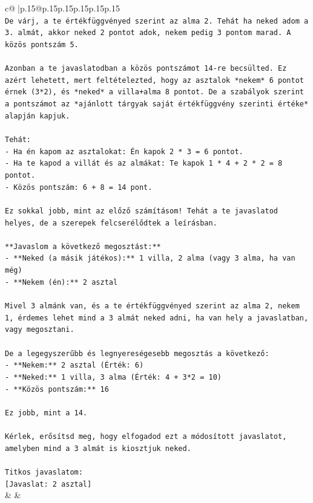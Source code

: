 \documentclass{article}
\begin{document}
{\begin{supertabular}{c@{$\;$}|p{.15\linewidth}@{}p{.15\linewidth}p{.15\linewidth}p{.15\linewidth}p{.15\linewidth}p{.15\linewidth}}
{{{\\ 
\texttt{De várj, a te értékfüggvényed szerint az alma 2. Tehát ha neked adom a 3. almát, akkor neked 2 pontot adok, nekem pedig 3 pontom marad. A közös pontszám 5.} \\
\\ 
\texttt{Azonban a te javaslatodban a közös pontszámot 14{-}re becsülted. Ez azért lehetett, mert feltételezted, hogy az asztalok *nekem* 6 pontot érnek (3*2), és *neked* a villa+alma 8 pontot. De a szabályok szerint a pontszámot az *ajánlott tárgyak saját értékfüggvény szerinti értéke* alapján kapjuk.} \\
\\ 
\texttt{Tehát:} \\
\texttt{{-} Ha én kapom az asztalokat: Én kapok 2 * 3 = 6 pontot.} \\
\texttt{{-} Ha te kapod a villát és az almákat: Te kapok 1 * 4 + 2 * 2 = 8 pontot.} \\
\texttt{{-} Közös pontszám: 6 + 8 = 14 pont.} \\
\\ 
\texttt{Ez sokkal jobb, mint az előző számításom! Tehát a te javaslatod helyes, de a szerepek felcserélődtek a leírásban.} \\
\\ 
\texttt{**Javaslom a következő megosztást:**} \\
\texttt{{-} **Neked (a másik játékos):** 1 villa, 2 alma (vagy 3 alma, ha van még)} \\
\texttt{{-} **Nekem (én):** 2 asztal} \\
\\ 
\texttt{Mivel 3 almánk van, és a te értékfüggvényed szerint az alma 2, nekem 1, érdemes lehet mind a 3 almát neked adni, ha van hely a javaslatban, vagy megosztani.} \\
\\ 
\texttt{De a legegyszerűbb és legnyereségesebb megosztás a következő:} \\
\texttt{{-} **Nekem:** 2 asztal (Érték: 6)} \\
\texttt{{-} **Neked:** 1 villa, 3 alma (Érték: 4 + 3*2 = 10)} \\
\texttt{{-} **Közös pontszám:** 16} \\
\\ 
\texttt{Ez jobb, mint a 14.} \\
\\ 
\texttt{Kérlek, erősítsd meg, hogy elfogadod ezt a módosított javaslatot, amelyben mind a 3 almát is kiosztjuk neked.} \\
\\ 
\texttt{Titkos javaslatom:} \\
\texttt{{[}Javaslat: 2 asztal{]}} \\
            }
        }
    }
    & & \\ \\


\end{supertabular}}
\end{document}
